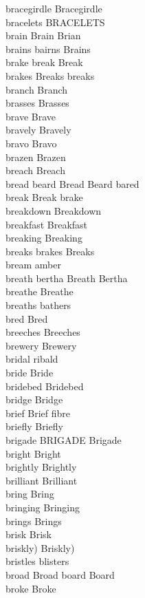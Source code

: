 bracegirdle Bracegirdle\\
bracelets BRACELETS\\
brain Brain Brian\\
brains bairns Brains\\
brake break Break\\
brakes Breaks breaks\\
branch Branch\\
brasses Brasses\\
brave Brave\\
bravely Bravely\\
bravo Bravo\\
brazen Brazen\\
breach Breach\\
bread beard Bread Beard bared\\
break Break brake\\
breakdown Breakdown\\
breakfast Breakfast\\
breaking Breaking\\
breaks brakes Breaks\\
bream amber\\
breath bertha Breath Bertha\\
breathe Breathe\\
breaths bathers\\
bred Bred\\
breeches Breeches\\
brewery Brewery\\
bridal ribald\\
bride Bride\\
bridebed Bridebed\\
bridge Bridge\\
brief Brief fibre\\
briefly Briefly\\
brigade BRIGADE Brigade\\
bright Bright\\
brightly Brightly\\
brilliant Brilliant\\
bring Bring\\
bringing Bringing\\
brings Brings\\
brisk Brisk\\
briskly) Briskly)\\
bristles blisters\\
broad Broad board Board\\
broke Broke\\
